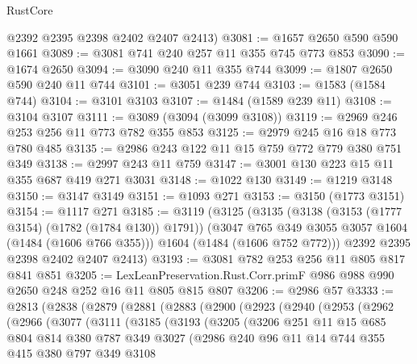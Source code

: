 \begin{lexlean}{RustCore}
\begin{coremodule}
      @2392
      @2395
      @2398
      @2402
      @2407
      @2413)
@3081 := @1657 @2650 @590 @590 @1661
@3089 := @3081 @741 @240 @257 @11 @355 @745 @773 @853
@3090 := @1674 @2650
@3094 := @3090 @240 @11 @355 @744
@3099 := @1807 @2650 @590 @240 @11 @744
@3101 := @3051 @239 @744
@3103 := @1583 (@1584 @744)
@3104 := @3101 @3103
@3107 := @1484 (@1589 @239 @11)
@3108 := @3104 @3107
@3111 := @3089 (@3094 (@3099 @3108))
@3119 := @2969 @246 @253 @256 @11 @773 @782 @355 @853
@3125 := @2979 @245 @16 @18 @773 @780 @485
@3135 := @2986 @243 @122 @11 @15 @759 @772 @779 @380 @751 @349
@3138 := @2997 @243 @11 @759
@3147 := @3001 @130 @223 @15 @11 @355 @687 @419 @271 @3031
@3148 := @1022 @130
@3149 := @1219 @3148
@3150 := @3147 @3149
@3151 := @1093 @271
@3153 := @3150 (@1773 @3151)
@3154 := @1117 @271
@3185 := @3119
    (@3125
      (@3135
        (@3138 (@3153 (@1777 @3154) (@1782 (@1784 @130)) @1791))
        (@3047 @765 @349 @3055 @3057 @1604 (@1484 (@1606 @766 @355)))
        @1604
        (@1484 (@1606 @752 @772)))
      @2392
      @2395
      @2398
      @2402
      @2407
      @2413)
@3193 := @3081 @782 @253 @256 @11 @805 @817 @841 @851
@3205 := LexLeanPreservation.Rust.Corr.primF @986 @988 @990 @2650 @248 @252 @16 @11 @805 @815 @807
@3206 := @2986 @57
@3333 := @2813
    (@2838
      (@2879
        (@2881
          (@2883
            (@2900
              (@2923
                (@2940
                  (@2953
                    (@2962
                      (@2966
                        (@3077
                          (@3111
                            (@3185
                              (@3193
                                (@3205
                                  (@3206
                                    @251
                                    @11
                                    @15
                                    @685
                                    @804
                                    @814
                                    @380
                                    @787
                                    @349
                                    @3027
                                    (@2986
                                      @240
                                      @96
                                      @11
                                      @14
                                      @744
                                      @355
                                      @415
                                      @380
                                      @797
                                      @349
                                      @3108

\end{coremodule}
\end{lexlean}
